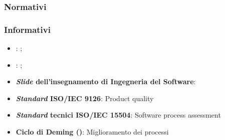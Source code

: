 \subsubsection{Normativi}
\riferimentiNormativi

\subsubsection{Informativi}
\begin{itemize}
	\item \textbf{\AdR}: \analisiDeiRequisiti;
	\item \textbf{\PdP}: \pianoDiProgetto;
	\item \textbf{\textit{Slide} dell'insegnamento di Ingegneria del Software}: \\
	\item \textbf{\textit{Standard} ISO/IEC 9126}: Product quality \\
	\item \textbf{\textit{Standard} tecnici ISO/IEC 15504}: Software process assessment \\
	\item \textbf{Ciclo di Deming ()}: Miglioramento dei processi \\
\end{itemize}

\newpage